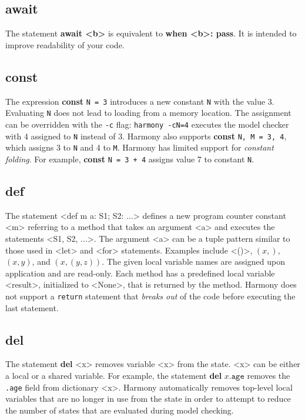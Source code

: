 \documentclass{report}
\begin{document}
\subsection*{\textbf{await}}

The statement \textbf{await <{b}>} is equivalent to \textbf{when <{b}>: pass}.
It is intended to improve readability of your code.

\subsection*{\textbf{const}}

The expression \textbf{const} \texttt{N = 3} introduces a new constant
\texttt{N} with the value 3.  Evaluating \texttt{N} does not lead to
loading from a memory location.  The assignment can be overridden with
the \texttt{-c} flag: \texttt{harmony -cN=4} executes the model checker
with 4 assigned to \texttt{N} instead of 3.
Harmony also supports \textbf{const} \texttt{N, M = 3, 4}, which
assigns 3 to \texttt{N} and 4 to \texttt{M}.
Harmony has limited support for \emph{constant folding}.  For example,
\textbf{const} \texttt{N = 3 + 4} assigns value 7 to constant \texttt{N}.

\subsection*{\textbf{def}}

The statement <{def m a: S1; S2: ...}>
defines a new program counter constant <{m}> referring to
a method that takes an argument <{a}> and executes the statements
<{S1, S2, ...}>.  The argument <{a}> can be a tuple pattern similar
to those used in <{let}> and <{for}> statements.
Examples include <{()}>, $(x,)$, $(x, y)$, and $(x, (y, z))$.
The given local variable names are assigned upon application and
are read-only.
Each method has a predefined local variable
<{result}>, initialized to <{None}>,
that is returned by the method.  Harmony does
not support a \texttt{return} statement that \emph{breaks out}
of the code before executing the last statement.

\subsection*{\textbf{del}}

The statement \textbf{del} <{x}> removes variable <{x}> from the
state.  <{x}> can be either a local or a shared variable.  For
example, the statement \textbf{del} $x.\texttt{age}$ removes
the \texttt{.age} field from dictionary <{x}>.
Harmony automatically removes top-level local variables that
are no longer in use
from the state in order to attempt to reduce the number of states
that are evaluated during model checking.
\end{document}
